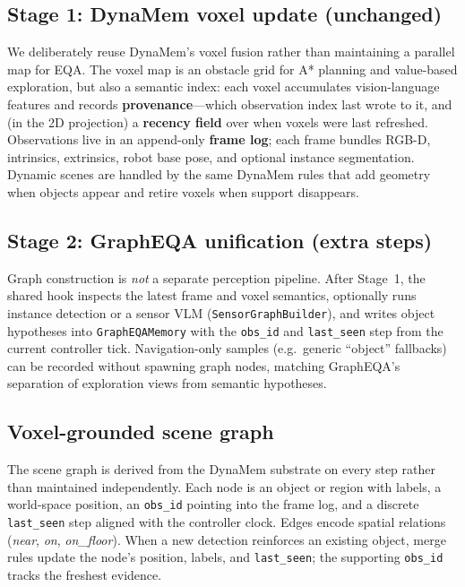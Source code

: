 \subsection{Stage 1: DynaMem voxel update (unchanged)}

We deliberately reuse DynaMem's voxel fusion rather than maintaining a parallel map for EQA.
The voxel map is an obstacle grid for A* planning and value-based exploration, but also a semantic index: each voxel accumulates vision-language features and records \textbf{provenance}---which observation index last wrote to it, and (in the 2D projection) a \textbf{recency field} over when voxels were last refreshed.
Observations live in an append-only \textbf{frame log}; each frame bundles RGB-D, intrinsics, extrinsics, robot base pose, and optional instance segmentation.
Dynamic scenes are handled by the same DynaMem rules that add geometry when objects appear and retire voxels when support disappears.

\subsection{Stage 2: GraphEQA unification (extra steps)}

Graph construction is \emph{not} a separate perception pipeline.
After Stage~1, the shared hook inspects the latest frame and voxel semantics, optionally runs instance detection or a sensor VLM (\texttt{SensorGraphBuilder}), and writes object hypotheses into \texttt{GraphEQAMemory} with the \texttt{obs\_id} and \texttt{last\_seen} step from the current controller tick.
Navigation-only samples (e.g.\ generic ``object'' fallbacks) can be recorded without spawning graph nodes, matching GraphEQA's separation of exploration views from semantic hypotheses.

\subsection{Voxel-grounded scene graph}

The scene graph is derived from the DynaMem substrate on every step rather than maintained independently.
Each node is an object or region with labels, a world-space position, an \texttt{obs\_id} pointing into the frame log, and a discrete \texttt{last\_seen} step aligned with the controller clock.
Edges encode spatial relations (\emph{near}, \emph{on}, \emph{on\_floor}).
When a new detection reinforces an existing object, merge rules update the node's position, labels, and \texttt{last\_seen}; the supporting \texttt{obs\_id} tracks the freshest evidence.

